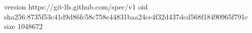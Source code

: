 version https://git-lfs.github.com/spec/v1
oid sha256:8735f53c41d9d86fc58c758e44831baa24ce4f32d437dcd568f18490965f791c
size 1048672
